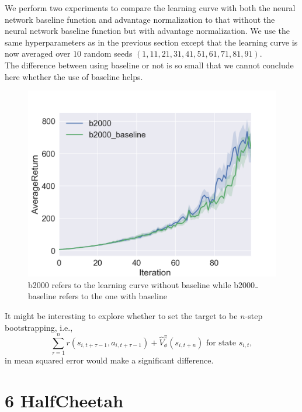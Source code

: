 \documentclass[a4paper]{article}
\theoremstyle{definition}
\begin{document}
We perform two experiments to compare the learning curve with both the neural network baseline function and advantage normalization to that without the neural network baseline function but with advantage normalization. We use the same hyperparameters as in the previous section except that the learning curve is now averaged over $10$ random seeds $(1, 11, 21, 31, 41, 51, 61, 71, 81, 91)$.\\

The difference between using baseline or not is so small that we cannot conclude here whether the use of baseline helps.\\

\begin{figure}[H]
\centering
\includegraphics[width=0.4\linewidth]{figures/baseline.png}
\caption{b2000 refers to the learning curve without baseline while b2000$\rule{0.15cm}{0.15mm}$baseline refers to the one with baseline}
\end{figure}

It might be interesting to explore whether to set the target to be $n$-step bootstrapping, i.e., 
\begin{equation}
\sum_{\tau=1}^{n}r(s_{i, t+\tau-1}, a_{i, t+\tau-1}) + \hat{V}_{\phi}^{\pi}(s_{i, t+n}) \text{ for state }s_{i, t},
\end{equation}
in mean squared error would make a significant difference.

\section*{6 HalfCheetah}
\end{document}
